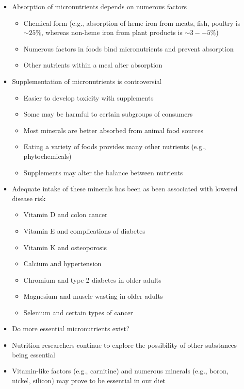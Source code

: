\documentclass[title={Chapter 6}]{fdsn201notes}
\begin{document}
\begin{itemize}
	\item Absorption of micronutrients depends on numerous factors
	\begin{itemize}
		\item Chemical form (e.g., absorption of heme iron from meats, fish, poultry is $\sim25\%$, whereas non-heme iron from plant products is $\sim3--5\%$)
		\item Numerous factors in foods bind micronutrients and prevent absorption
		\item Other nutrients within a meal alter absorption
	\end{itemize}
	\item Supplementation of micronutrients is controversial
	\begin{itemize}
		\item Easier to develop toxicity with supplements
		\item Some may be harmful to certain subgroups of consumers
		\item Most minerals are better absorbed from animal food sources
		\item Eating a variety of foods provides many other nutrients (e.g., phytochemicals)
		\item Supplements may alter the balance between nutrients
	\end{itemize}
	\item Adequate intake of these minerals has been as been associated with lowered disease risk
	\begin{itemize}
		\item Vitamin D and colon cancer
		\item Vitamin E and complications of diabetes
		\item Vitamin K and osteoporosis
		\item Calcium and hypertension
		\item Chromium and type 2 diabetes in older adults
		\item Magnesium and muscle wasting in older adults
		\item Selenium and certain types of cancer
	\end{itemize}
	\item Do more essential micronutrients exist?
	\item Nutrition researchers continue to explore the possibility of other substances being essential
	\item Vitamin-like factors (e.g., carnitine) and numerous minerals (e.g., boron, nickel, silicon) may prove to be essential in our diet
\end{itemize}
\end{document}
